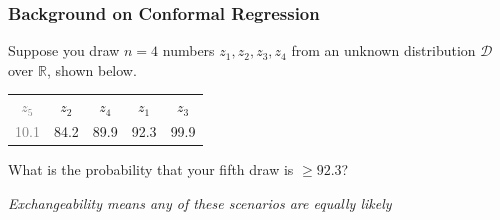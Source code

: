 \documentclass[handout]{beamer}
\begin{document}
\begin{frame}
    \frametitle{Background on Conformal Regression \cite{lei2018distribution}}

    Suppose you draw $n=4$ numbers $z_1, z_2, z_3, z_4$ from an unknown distribution $\mathcal{D}$ over $\mathbb{R}$, shown below.

    \vspace{3em}

    \begin{center}
    \begin{tabular}{ccccc}
    \textcolor{gray}{$z_5$} & $z_2$ & $z_4$ & $z_1$ & $z_3$ \\
    \textcolor{gray}{10.1} & 84.2 & 89.9 & 92.3 & 99.9
    \end{tabular}
    \end{center}
    
    \vspace{3em}

    What is the probability that your fifth draw is $\geq 92.3$? 

    \vspace{1em}

    \textit{Exchangeability means any of these scenarios are equally likely}

\end{frame}
\end{document}
